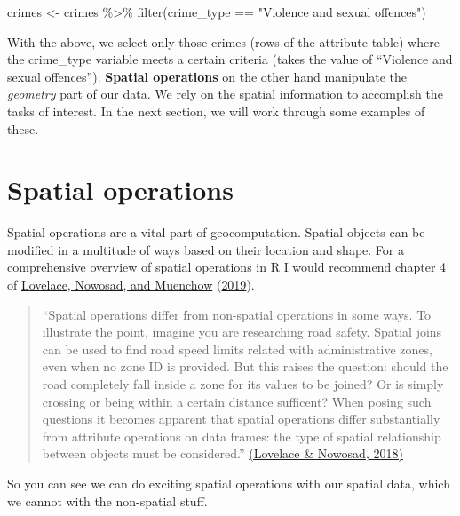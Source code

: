 \documentclass[
]{book}
\newenvironment{Shaded}{\begin{snugshade}}{\end{snugshade}}
\newcommand{\FunctionTok}[1]{\textcolor[rgb]{0.00,0.00,0.00}{#1}}
\newcommand{\NormalTok}[1]{#1}
\newcommand{\OtherTok}[1]{\textcolor[rgb]{0.56,0.35,0.01}{#1}}
\newcommand{\SpecialCharTok}[1]{\textcolor[rgb]{0.00,0.00,0.00}{#1}}
\newcommand{\StringTok}[1]{\textcolor[rgb]{0.31,0.60,0.02}{#1}}
\begin{document}
\begin{Shaded}
\begin{Highlighting}[]
\NormalTok{crimes }\OtherTok{\textless{}{-}}\NormalTok{ crimes }\SpecialCharTok{\%\textgreater{}\%} 
  \FunctionTok{filter}\NormalTok{(crime\_type }\SpecialCharTok{==} \StringTok{"Violence and sexual offences"}\NormalTok{)}
\end{Highlighting}
\end{Shaded}

With the above, we select only those crimes (rows of the attribute table) where the crime\_type variable meets a certain criteria (takes the value of ``Violence and sexual offences''). \textbf{Spatial operations} on the other hand manipulate the \emph{geometry} part of our data. We rely on the spatial information to accomplish the tasks of interest. In the next section, we will work through some examples of these.

\hypertarget{spatial-operations}{%
\section{Spatial operations}\label{spatial-operations}}

Spatial operations are a vital part of geocomputation. Spatial objects can be modified in a multitude of ways based on their location and shape. For a comprehensive overview of spatial operations in R I would recommend chapter 4 of \protect\hyperlink{ref-Lovelace_2019}{Lovelace, Nowosad, and Muenchow} (\protect\hyperlink{ref-Lovelace_2019}{2019}).

\begin{quote}
``Spatial operations differ from non-spatial operations in some ways. To illustrate the point, imagine you are researching road safety. Spatial joins can be used to find road speed limits related with administrative zones, even when no zone ID is provided. But this raises the question: should the road completely fall inside a zone for its values to be joined? Or is simply crossing or being within a certain distance sufficent? When posing such questions it becomes apparent that spatial operations differ substantially from attribute operations on data frames: the type of spatial relationship between objects must be considered.'' \href{https://geocompr.robinlovelace.net/spatial-operations.html}{(Lovelace \& Nowosad, 2018)}
\end{quote}

So you can see we can do exciting spatial operations with our spatial data, which we cannot with the non-spatial stuff.
\end{document}

